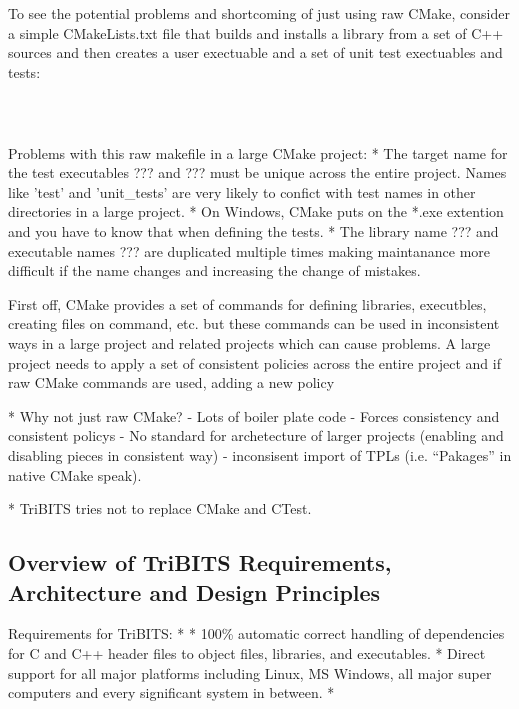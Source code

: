\documentclass[10pt]{article}
\begin{document}
To see the potential problems and shortcoming of just using raw CMake, consider a simple CMakeLists.txt file that builds and installs a library from a set of C++ sources and then creates a user exectuable and a set of unit test exectuables and tests:

\begin{verbatim}



\end{verbatim}


Problems with this raw makefile in a large CMake project:
* The target name for the test executables ??? and ??? must be unique across the entire project.  Names like 'test' and 'unit_tests' are very likely to confict with test names in other directories in a large project.
* On Windows, CMake puts on the *.exe extention and you have to know that when defining the tests.
* The library name ??? and executable names ??? are duplicated multiple times making maintanance more difficult if the name changes and increasing the change of mistakes.




First off, CMake provides a set of commands for defining libraries, executbles, creating files on command, etc. but these commands can be used in inconsistent ways in a large project and related projects which can cause problems.  A large project needs to apply a set of consistent policies across the entire project and if raw CMake commands are used, adding a new policy 

* Why not just raw CMake?
  - Lots of boiler plate code
  - Forces consistency and consistent policys
  - No standard for archetecture of larger projects (enabling and disabling pieces in consistent way)
  - inconsisent import of TPLs (i.e. ``Pakages'' in native CMake speak).

* TriBITS tries not to replace CMake and CTest.

%
\subsection{Overview of TriBITS Requirements, Architecture and Design Principles}
%

Requirements for TriBITS:
* 
* 100\% automatic correct handling of dependencies for C and C++ header files to object files, libraries, and executables.
* Direct support for all major platforms including Linux, MS Windows,  all major super computers and every significant system in between.
* 
\end{document}
